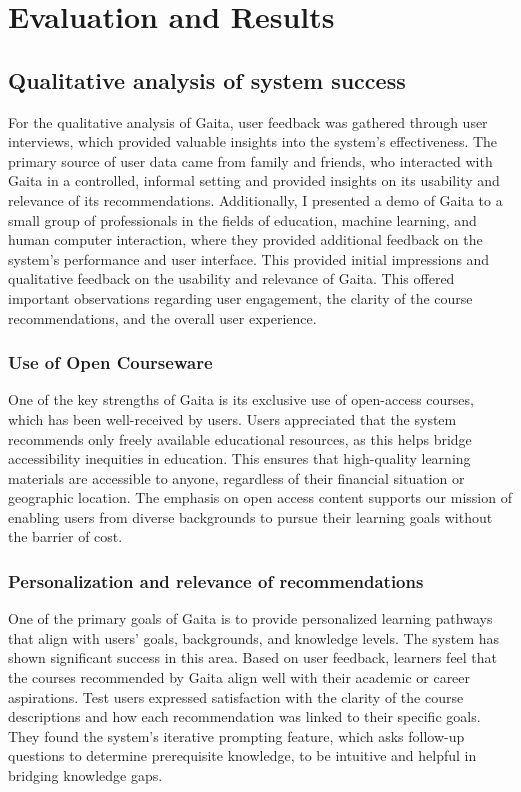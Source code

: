 \chapter{Evaluation and Results} \label{chap:chap-5}



\section{Qualitative analysis of system success}

For the qualitative analysis of Gaita, user feedback was gathered through user interviews, which provided valuable insights into the system’s effectiveness. The primary source of user data came from family and friends, who interacted with Gaita in a controlled, informal setting and provided insights on its usability and relevance of its recommendations. Additionally, I presented a demo of Gaita to a small group of professionals in the fields of education, machine learning, and human computer interaction, where they provided additional feedback on the system’s performance and user interface. This provided initial impressions and qualitative feedback on the usability and relevance of Gaita. This offered important observations regarding user engagement, the clarity of the course recommendations, and the overall user experience.


\subsection{Use of Open Courseware}

One of the key strengths of Gaita is its exclusive use of open-access courses, which has been well-received by users. Users appreciated that the system recommends only freely available educational resources, as this helps bridge accessibility inequities in education. This ensures that high-quality learning materials are accessible to anyone, regardless of their financial situation or geographic location. The emphasis on open access content supports our mission of enabling users from diverse backgrounds to pursue their learning goals without the barrier of cost. 

\subsection{Personalization and relevance of recommendations} 

One of the primary goals of Gaita is to provide personalized learning pathways that align with users’ goals, backgrounds, and knowledge levels. The system has shown significant success in this area. Based on user feedback, learners feel that the courses recommended by Gaita align well with their academic or career aspirations. Test users expressed satisfaction with the clarity of the course descriptions and how each recommendation was linked to their specific goals. They found the system's iterative prompting feature, which asks follow-up questions to determine prerequisite knowledge, to be intuitive and helpful in bridging knowledge gaps. 

